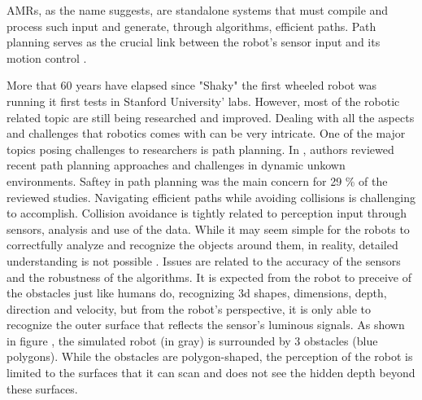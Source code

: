 AMRs, as the name suggests, are 
standalone systems that must compile and process such input and generate, through algorithms, 
efficient paths. Path planning serves as the crucial 
link between the robot’s sensor input and its motion control \cite{R10}.


More that 60 years have elapsed since "Shaky" the first wheeled robot was running it first tests
in Stanford University' labs. However, most of the robotic related topic are still being researched and improved.
Dealing with all the aspects and challenges that robotics comes with can be very intricate. One of the major 
topics posing challenges to researchers is path planning. 
In \cite{R20}, authors reviewed recent path planning approaches and challenges
in dynamic unkown environments. 
Saftey in path planning was the main concern for 29 \% of the reviewed studies. Navigating efficient 
paths while avoiding collisions is challenging to accomplish. Collision avoidance is tightly related to perception 
input through sensors, analysis and use of the data. While it may seem simple for the robots to correctfully analyze 
and recognize the objects around them, in reality, detailed understanding is not possible \cite{R21}. Issues are 
related to the accuracy of the sensors and the robustness of the algorithms. 
It is expected from the robot to 
preceive of the obstacles just like humans do, recognizing 3d shapes, dimensions, depth, direction and velocity, 
but from the 
robot's perspective, it is only able to recognize the outer surface that reflects the sensor's luminous signals. As shown in
figure , the simulated robot (in gray) is surrounded by 3 obstacles (blue polygons).
While the obstacles are polygon-shaped, the perception of the robot is limited to the surfaces that 
it can scan and does not see the hidden depth beyond these surfaces.

